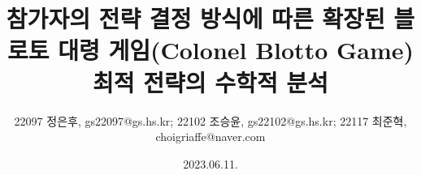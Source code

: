\title{참가자의 전략 결정 방식에 따른 확장된 블로토 대령 게임(Colonel Blotto Game) 최적 전략의 수학적 분석}
\author{22097 정은후, gs22097@gs.hs.kr; 22102 조승윤, gs22102@gs.hs.kr; 22117 최준혁, choigriaffe@naver.com}
\date{2023.06.11.}
